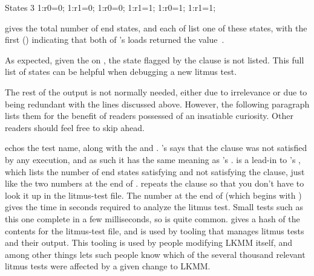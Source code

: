 \begin{fcvlabel}
\begin{VerbatimN}[commandchars=\%\@\$,firstnumber=2]
	States 3         %
	1:r0=0; 1:r1=0;  %
	1:r0=0; 1:r1=1;  %
	1:r0=1; 1:r1=1;  %
\end{VerbatimN}
\end{fcvlabel}

\begin{fcvref}
 gives the total number of end states, and each of
 list one of these states, with the first
() indicating that both of 's loads returned
the value~.
\end{fcvref}
\begin{fcvref}
As expected, given the  on , the state flagged by
the  clause is not listed.
This full list of states can be helpful when debugging a new litmus test.

The rest of the output is not normally needed, either due to irrelevance
or due to being redundant with the lines discussed above.
However, the following paragraph lists them for the benefit of readers
possessed of an insatiable curiosity.
Other readers should feel free to skip ahead.

 echos the test name, along with the  and .
's  says that the  clause was not satisfied by
any execution, and as such it has the same meaning as 's .
 is a lead-in to 's ,
which lists the number of end states satisfying and not satisfying the
 clause, just like the two numbers at the end of .
 repeats the  clause so that you don't have to
look it up in the litmus-test file.
The number at the end of  (which begins with ) gives the
time in seconds required to analyze the litmus test.
Small tests such as this one complete in a few milliseconds, so 
is quite common.
 gives a hash of the contents for the litmus-test file, and is used
by tooling that manages litmus tests and their output.
This tooling is used by people modifying LKMM itself, and among other things
lets such people know which of the several thousand relevant litmus tests were
affected by a given change to LKMM\@.
\end{fcvref}


